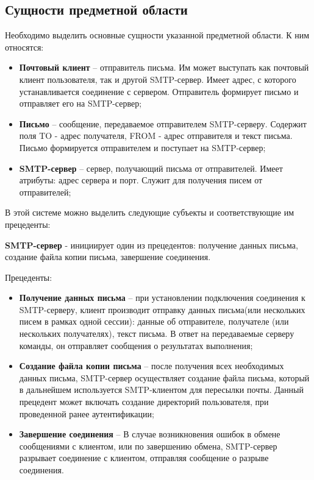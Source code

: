 \documentclass[a4paper,12pt]{report}
\begin{document}
\subsection{Сущности предметной области}
Необходимо выделить основные сущности указанной предметной области. К ним относятся:

\begin{itemize}
	
		\item \textbf{Почтовый клиент} – отправитель письма. Им может выступать как почтовый клиент пользователя, так и другой SMTP-сервер. Имеет адрес, с которого устанавливается соединение с сервером. Отправитель формирует письмо и отправляет его на SMTP-сервер;
		\item \textbf{Письмо} – сообщение, передаваемое отправителем SMTP-серверу. Содержит поля TO - адрес получателя, FROM - адрес отправителя и текст письма. Письмо формируется отправителем и поступает на SMTP-сервер; 
		\item \textbf{SMTP-сервер} – сервер, получающий письма от отправителей. Имеет атрибуты: адрес сервера и порт. Служит для получения писем от отправителей; 

\end{itemize}

\newpage
В этой системе можно выделить следующие субъекты и соответствующие им прецеденты:

\textbf{SMTP-сервер} - инициирует один из прецедентов: получение данных письма, создание файла копии письма, завершение соединения.

Прецеденты:
\begin{itemize}
	
		\item \textbf{Получение данных письма} – при установлении подключения соединения к SMTP-серверу, клиент производит отправку данных письма(или нескольких писем в рамках одной сессии): данные об отправителе, получателе (или нескольких получателях), текст письма. В ответ на передаваемые серверу команды, он отправляет сообщения о результатах выполнения;
		\item \textbf{Создание файла копии письма} – после получения всех необходимых данных письма, SMTP-сервер осуществляет создание файла письма, который в дальнейшем используется SMTP-клиентом для пересылки почты. Данный прецедент может включать создание директорий пользователя, при проведенной ранее аутентификации;
		\item \textbf{Завершение соединения} – В случае возникновения ошибок в обмене сообщениями с клиентом, или по завершению обмена, SMTP-сервер разрывает соединение с клиентом, отправляя сообщение о разрыве соединения.

\end{itemize}
\end{document}
